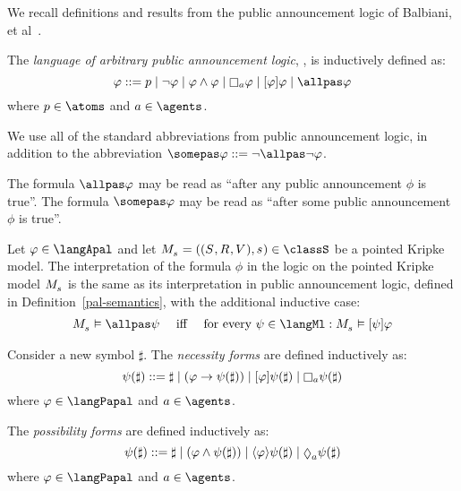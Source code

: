 We recall definitions and results from the public announcement logic of Balbiani, et al~\cite{balbiani:2008}.

\begin{definition}
The {\em language of arbitrary public announcement logic}, \langApal{}, is inductively defined as:
$$
\phi ::= 
    \atomP \mid
    \lnot \phi \mid
    \phi \land \phi \mid
    \necessaryA \phi \mid
    \announceA{\phi} \phi \mid
    \allpas \phi
$$
where $\atomP \in \atoms$ and $\agentA \in \agents$.
\end{definition}

We use all of the standard abbreviations from public announcement logic, in addition to the abbreviation $\somepas \phi ::= \lnot \allpas \lnot \phi$.

The formula $\allpas \phi$ may be read as ``after any public announcement $\phi$ is true''.
The formula $\somepas \phi$ may be read as ``after some public announcement $\phi$ is true''.

\begin{definition}
Let $\phi \in \langApal$ and let $\kPModelAndTuple{\kStateS} \in \classS$ be a pointed Kripke model.
The interpretation of the formula $\phi$ in the logic \logicApalS{} on the pointed Kripke model $\kPModel{\kStateS}$ is the same as its interpretation in public announcement logic, defined in Definition~\ref{pal-semantics}, with the additional inductive case:
$$
\begin{array}{lcl}
    \kPModel{\kStateS} \entails \allpas \psi & \text{ iff } & \text{for every } \psi \in \langMl : \kPModel{\kStateS} \entails \announceA{\psi} \phi
\end{array}
$$
\end{definition}

\begin{definition}
Consider a new symbol $\sharp$. The {\em necessity forms} are defined inductively as:
$$\psi(\sharp) ::= \sharp \mid (\phi \implies \psi(\sharp)) \mid \announceA{\phi} \psi(\sharp) \mid \knows[\agentA] \psi(\sharp)$$
where $\phi \in \langPapal$ and $\agentA \in \agents$.

The {\em possibility forms} are defined inductively as:
$$\psi(\sharp) ::= \sharp \mid (\phi \land \psi(\sharp)) \mid \announceE{\phi} \psi(\sharp) \mid \suspects[\agentA] \psi(\sharp)$$
where $\phi \in \langPapal$ and $\agentA \in \agents$.
\end{definition}


